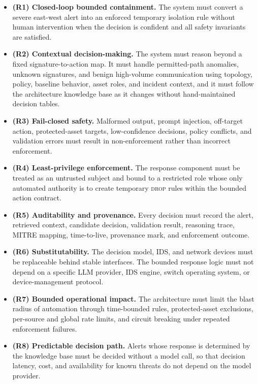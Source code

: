 \documentclass[final,5p]{elsarticle}
\begin{document}
\begin{itemize}
    \item \textbf{(R1) Closed-loop bounded containment.} The system must convert a severe east-west alert into an enforced temporary isolation rule without human intervention when the decision is confident and all safety invariants are satisfied.

    \item \textbf{(R2) Contextual decision-making.} The system must reason beyond a fixed signature-to-action map. It must handle permitted-path anomalies, unknown signatures, and benign high-volume communication using topology, policy, baseline behavior, asset roles, and incident context, and it must follow the architecture knowledge base as it changes without hand-maintained decision tables.

    \item \textbf{(R3) Fail-closed safety.} Malformed output, prompt injection, off-target action, protected-asset targets, low-confidence decisions, policy conflicts, and validation errors must result in non-enforcement rather than incorrect enforcement.

    \item \textbf{(R4) Least-privilege enforcement.} The response component must be treated as an untrusted subject and bound to a restricted role whose only automated authority is to create temporary \textsc{drop} rules within the bounded action contract.

    \item \textbf{(R5) Auditability and provenance.} Every decision must record the alert, retrieved context, candidate decision, validation result, reasoning trace, MITRE mapping, time-to-live, provenance mark, and enforcement outcome.

    \item \textbf{(R6) Substitutability.} The decision model, IDS, and network devices must be replaceable behind stable interfaces. The bounded response logic must not depend on a specific LLM provider, IDS engine, switch operating system, or device-management protocol.

    \item \textbf{(R7) Bounded operational impact.} The architecture must limit the blast radius of automation through time-bounded rules, protected-asset exclusions, per-source and global rate limits, and circuit breaking under repeated enforcement failures.

    \item \textbf{(R8) Predictable decision path.} Alerts whose response is determined by the knowledge base must be decided without a model call, so that decision latency, cost, and availability for known threats do not depend on the model provider.
\end{itemize}
\end{document}

